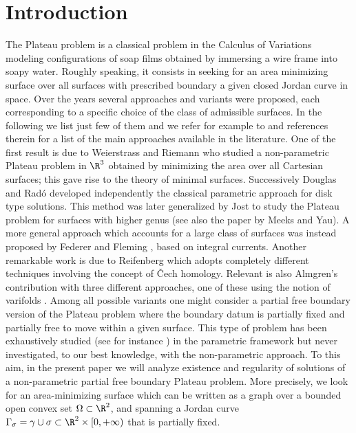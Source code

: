 \section{Introduction}\label{sec:introduction}

The Plateau problem is a classical problem in the Calculus of Variations modeling configurations of soap films obtained by immersing a wire frame into soapy water. Roughly speaking, it consists in seeking for an area minimizing surface over all surfaces with prescribed boundary a given closed Jordan curve in space.
Over the years several approaches and variants were proposed, each corresponding to a specific choice of the class of admissible surfaces. In the following we list just few of them and we refer for example to \cite{Harrison-Pugh} and references therein for a list of the main approaches available in the literature.
One of the first result is due to Weierstrass and Riemann who studied a non-parametric Plateau problem in $\R^3$
obtained by minimizing the area over all Cartesian surfaces; this gave rise to the theory of minimal surfaces.
Successively Douglas and Radó developed independently \cite{Douglas,Rado} the classical parametric approach for disk type solutions. This method was later generalized by Jost \cite{Jost} to study the Plateau problem for surfaces with higher genus (see also
the paper \cite{MY} by Meeks and Yau).
A more general approach which accounts for a large class of surfaces was instead proposed by Federer and Fleming \cite{FedererFleming},
based on integral currents. Another remarkable work is due to Reifenberg \cite{Reifenberg} which adopts completely different techniques involving the concept of Čech homology. Relevant is also Almgren's contribution with three different approaches, one of these using the notion of varifolds \cite{Almgren65}.
Among all possible variants one might consider a partial free boundary version of the Plateau problem where the boundary datum is partially
fixed and partially free to move within a given surface.
This type of problem has been exhaustively studied (see for instance \cite{DHS}) in the parametric framework but never investigated,
to our best knowledge, with the non-parametric approach. To this aim, in the present paper we will analyze existence and regularity of solutions of a non-parametric partial free boundary Plateau problem.
More precisely,
we look for an area-minimizing surface
which can be written as a graph over a bounded open convex set
$\Omega\subset \R^2$,
and spanning
a Jordan curve $\Gamma_\sigma=\gamma\cup \sigma \subset \R^2 \times [0,+\infty)$ that is partially fixed.
